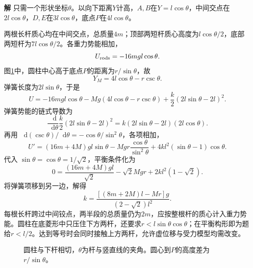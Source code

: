 \documentclass[11pt,openany,fontset=fandol]{ctexbook}
\theoremstyle{definition}\newtheorem{example}{例}[chapter]\newtheorem{exercise}{习题}[chapter]
\newcommand{\SolutionStart}{\par\medskip\ifdim\pagetotal>0pt\ifdim\dimexpr\pagegoal-\pagetotal\relax<3\baselineskip\newpage\fi\fi\noindent\textbf{解}\quad\ignorespaces}
\newenvironment{solution}{\SolutionStart}{\par\medskip}
\newcommand{\dd}{\mathop{}\!\mathrm d}\newcommand{\ee}{\mathrm e}\newcommand{\vct}[1]{\bm{#1}}
\begin{document}
\begin{solution}
只需一个形状坐标$\theta$。以向下距离$Y$计高，$A,B$在$Y=l\cos\theta$，中间交点在$2l\cos\theta$，$D,E$在$3l\cos\theta$，底点$P$在$4l\cos\theta$。

两根长杆质心均在中间交点，总质量$4m$；顶部两短杆质心高度为$l\cos\theta/2$，底部两短杆为$7l\cos\theta/2$。各重力势能相加，
\[
 U_{\rm rods}=-16mgl\cos\theta.
\]
图\ref{mp5:fig:hw:l5-33-s}中，圆柱中心高于底点$P$的距离为$r/\sin\theta$，故
\[
 Y_M=4l\cos\theta-r\csc\theta.
\]
弹簧长度为$2l\sin\theta$，于是
\[
 U=-16mgl\cos\theta-Mg(4l\cos\theta-r\csc\theta)
       +\frac k2(2l\sin\theta-2l)^2.
\]
弹簧势能的链式导数为
\[
\frac{\dd}{\dd\theta}\frac k2(2l\sin\theta-2l)^2
=k(2l\sin\theta-2l)(2l\cos\theta).
\]
再用 $\dd(\csc\theta)/\dd\theta=-\cos\theta/\sin^2\theta$，各项相加，
\[
 U'=(16m+4M)gl\sin\theta
      -Mgr\frac{\cos\theta}{\sin^2\theta}
      +4kl^2(\sin\theta-1)\cos\theta.
\]
代入 $\sin\theta=\cos\theta=1/\sqrt2$，平衡条件化为
\[
0=\frac{(16m+4M)gl}{\sqrt2}-\sqrt2Mgr
+2kl^2(1-\sqrt2).
\]
将弹簧项移到另一边，解得
\[
 \boxed{k=\frac{[(8m+2M)l-Mr]g}{(2-\sqrt2)l^2}}.
\]
每根长杆跨过中间铰点，两半段的总质量仍为$2m$，应按整根杆的质心计入重力势能。圆柱在底菱形中只压住下方两杆，还要求$r<l\sin\theta\cos\theta$；在平衡构形即为题给$r<l/2$。达到等号时会同时接触上方两杆，允许虚位移与受力模型均需改变。


\begin{figure}[H]\centering
{}
\caption{圆柱与下杆相切，$\theta$为杆与竖直线的夹角。圆心到$P$的高度差为$r/\sin\theta$。}\label{mp5:fig:hw:l5-33-s}
\end{figure}

\end{solution}
\end{document}
